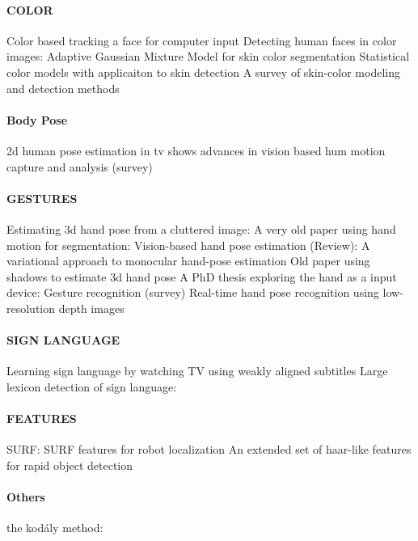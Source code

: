 \paragraph{COLOR}
Color based tracking a face for computer input \cite{Bradski1998}
Detecting human faces in color images: \cite{Cai1999}
Adaptive Gaussian Mixture Model for skin color segmentation \cite{Hassanpour2008}
Statistical color models with applicaiton to skin detection \cite{Jones1999}
A survey of skin-color modeling and detection methods \cite{Kakumanu2007}

\paragraph{Body Pose}
2d human pose estimation in tv shows \cite{ferrari2008}
advances in vision based hum motion capture and analysis (survey) \cite{Moeslund2006}

\paragraph{GESTURES}
Estimating 3d hand pose from a cluttered image: \cite{Athitsos2003}
A very old paper using hand motion for segmentation: \cite{Cui1996}
Vision-based hand pose estimation (Review): \cite{Erol2007}
A variational approach to monocular hand-pose estimation \cite{laGorce2010}
Old paper using shadows to estimate 3d hand pose \cite{Segen1999}
A PhD thesis exploring the hand as a input device: \cite{Sturman1992}
Gesture recognition (survey) \cite{Mitra2007}
Real-time hand pose recognition using low-resolution depth images \cite{Mo2006}

\paragraph{SIGN LANGUAGE}
Learning sign language by watching TV using weakly aligned subtitles \cite{Buehler2009}
Large lexicon detection of sign language: \cite{Cooper2007}

\paragraph{FEATURES}
SURF: \cite{Bay2006}
SURF features for robot localization \cite{Murillo2007}
An extended set of haar-like features for rapid object detection \cite{Lienhart2002}

\paragraph{Others}
the kod\'{a}ly method: \cite{choksy1999}





\cite{NavneetDalal2006}
\cite{Nickel2007}
\cite{Phung2002}
\cite{Poppe2007}
\cite{RichardBowden2004}

\cite{Sigal2004}
\cite{Soriano2000}
\cite{Stenger2006}

\cite{Stoerring1999}
\cite{Suzuki1985}
\cite{watanabe2009}
\cite{Valgren2010}
\cite{VanNort2009}
\cite{VandenBergh2009}
\cite{vsa03survey}
\cite{Viola2004}
\cite{Wang2007}
\cite{Wang2009}
\cite{Xiong2006}





